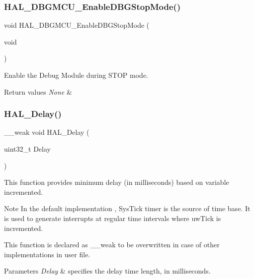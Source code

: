 \subsubsection{\texorpdfstring{H\+A\+L\+\_\+\+D\+B\+G\+M\+C\+U\+\_\+\+Enable\+D\+B\+G\+Stop\+Mode()}{HAL\_DBGMCU\_EnableDBGStopMode()}}
{\footnotesize\ttfamily void H\+A\+L\+\_\+\+D\+B\+G\+M\+C\+U\+\_\+\+Enable\+D\+B\+G\+Stop\+Mode (\begin{DoxyParamCaption}\item[{void}]{ }\end{DoxyParamCaption})}



Enable the Debug Module during S\+T\+OP mode. 


\begin{DoxyRetVals}{Return values}
{\em None} & \\
\hline
\end{DoxyRetVals}
\mbox{\label{group___h_a_l___exported___functions___group2_gab1dc1e6b438daacfe38a312a90221330}} 
\subsubsection{\texorpdfstring{H\+A\+L\+\_\+\+Delay()}{HAL\_Delay()}}
{\footnotesize\ttfamily \+\_\+\+\_\+weak void H\+A\+L\+\_\+\+Delay (\begin{DoxyParamCaption}\item[{uint32\+\_\+t}]{Delay }\end{DoxyParamCaption})}



This function provides minimum delay (in milliseconds) based on variable incremented. 

\begin{DoxyNote}{Note}
In the default implementation , Sys\+Tick timer is the source of time base. It is used to generate interrupts at regular time intervals where uw\+Tick is incremented. 

This function is declared as \+\_\+\+\_\+weak to be overwritten in case of other implementations in user file. 
\end{DoxyNote}

\begin{DoxyParams}{Parameters}
{\em Delay} & specifies the delay time length, in milliseconds. \\
\hline
\end{DoxyParams}

